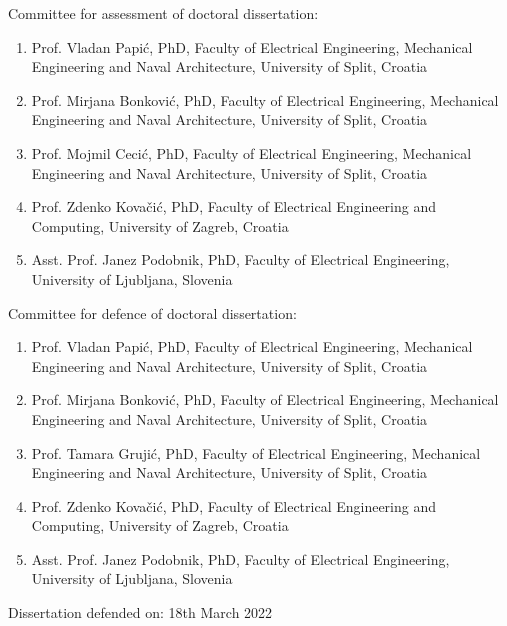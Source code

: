 \documentclass[12pt, twoside, onecolumn]{book}
\DeclareRobustCommand{\[}{\begin{equation}}
\DeclareRobustCommand{\]}{\end{equation}}
\begin{document}
\begin{titlepage}
\begin{flushleft}
\newpage
\textnormal{}
Committee for assessment of doctoral dissertation:

\begin{enumerate}
\item Prof. Vladan Papić, PhD, Faculty of Electrical Engineering, Mechanical Engineering and Naval Architecture, University of Split, Croatia
\item Prof. Mirjana Bonković, PhD, Faculty of Electrical Engineering, Mechanical Engineering and Naval Architecture, University of Split, Croatia
\item Prof. Mojmil Cecić, PhD, Faculty of Electrical Engineering, Mechanical Engineering and Naval Architecture, University of Split, Croatia
\item Prof. Zdenko Kovačić, PhD, Faculty of Electrical Engineering and Computing, University of Zagreb, Croatia
\item Asst. Prof. Janez Podobnik, PhD, Faculty of Electrical Engineering, University of Ljubljana, Slovenia
\end{enumerate}

\vskip 10mm
Committee for defence of doctoral dissertation:

\begin{enumerate}
\item Prof. Vladan Papić, PhD, Faculty of Electrical Engineering, Mechanical Engineering and Naval Architecture, University of Split, Croatia
\item Prof. Mirjana Bonković, PhD, Faculty of Electrical Engineering, Mechanical Engineering and Naval Architecture, University of Split, Croatia
\item Prof. Tamara Grujić, PhD, Faculty of Electrical Engineering, Mechanical Engineering and Naval Architecture, University of Split, Croatia
\item Prof. Zdenko Kovačić, PhD, Faculty of Electrical Engineering and Computing, University of Zagreb, Croatia
\item Asst. Prof. Janez Podobnik, PhD, Faculty of Electrical Engineering, University of Ljubljana, Slovenia
\end{enumerate}
\vskip 10mm
Dissertation defended on: 18th March 2022

\end{flushleft}





\newpage
\thispagestyle{empty}
\textnormal{}  %


\end{titlepage}
\end{document}
